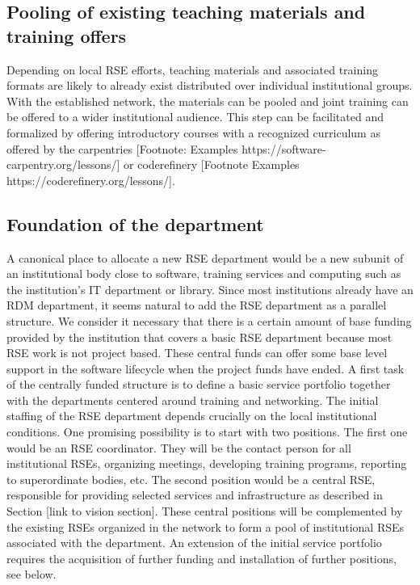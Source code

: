 \documentclass{article}
\begin{document}
\subsection{Pooling of existing teaching materials and training offers}

Depending on local RSE efforts, teaching materials and associated training formats are likely to already exist distributed over individual institutional groups.
With the established network, the materials can be pooled and joint training can be offered to a wider institutional audience.
This step can be facilitated and formalized by offering introductory courses with a recognized curriculum as offered by the carpentries  [Footnote: Examples https://software-carpentry.org/lessons/] or coderefinery [Footnote Examples https://coderefinery.org/lessons/].

\subsection{Foundation of the department}

A canonical place to allocate a new RSE department would be a new subunit of an institutional body close to software, training services and computing such as the institution's IT department or library.
Since most institutions already have an RDM department, it seems natural to add the RSE department as a parallel structure.
We consider it necessary that there is a certain amount of base funding provided by the institution that covers a basic RSE department because most RSE work is not project based.
These central funds can offer some base level support in the software lifecycle when the project funds have ended.
A first task of the centrally funded structure is to define a basic service portfolio together with the departments centered around training and networking.
The initial staffing of the RSE department depends crucially on the local institutional conditions. 
One promising possibility is to start with two positions. The first one would be an RSE coordinator.
They will be the contact person for all institutional RSEs, organizing meetings, developing training programs, reporting to superordinate bodies, etc.
The second position would be a central RSE, responsible for providing selected services and infrastructure as described in Section [link to vision section].
These central positions will be complemented by the existing RSEs organized in the network to form a pool of institutional RSEs associated with the department.
An extension of the initial service portfolio requires the acquisition of further funding and installation of further positions, see below.
\end{document}
